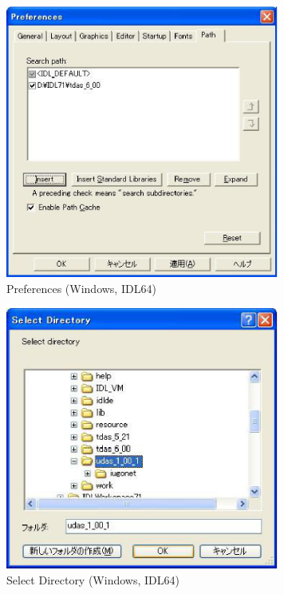 \documentclass[a4j]{jbook}
\begin{document}
\begin{figure}[H]
\begin{center}
\includegraphics[width=9cm]{fig_idl64/Fig3.eps}
\caption{Preferences (Windows, IDL64)}
\label{idl64/Fig3.eps}
\end{center}
\end{figure}

\begin{figure}[H]
\begin{center}
\includegraphics[width=9cm]{fig_idl71/Fig8.eps}
\caption{Select Directory (Windows, IDL64)}
\label{idl7164/Fig8.eps}
\end{center}
\end{figure}

\end{document}
